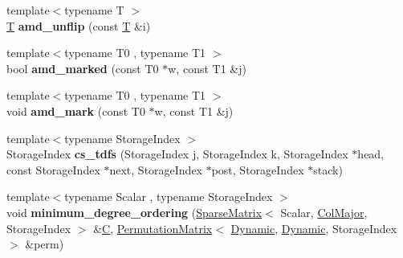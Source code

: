 \begin{DoxyCompactItemize}
\mbox{\label{namespace_eigen_1_1internal_a7f2c5d4a113f220aeb207d2e51173eb5}} 
{\footnotesize template$<$typename T $>$ }\\\hyperlink{group___sparse_core___module}{T} {\bfseries amd\+\_\+unflip} (const \hyperlink{group___sparse_core___module}{T} \&i)
\item 
\mbox{\label{namespace_eigen_1_1internal_aa833ee81053c3007dd4f7df2fd35e6cf}} 
{\footnotesize template$<$typename T0 , typename T1 $>$ }\\bool {\bfseries amd\+\_\+marked} (const T0 $\ast$w, const T1 \&j)
\item 
\mbox{\label{namespace_eigen_1_1internal_ac1ede6035fa6dd5dd1a84538be2163e9}} 
{\footnotesize template$<$typename T0 , typename T1 $>$ }\\void {\bfseries amd\+\_\+mark} (const T0 $\ast$w, const T1 \&j)
\item 
\mbox{\label{namespace_eigen_1_1internal_a10eccd9d3ce2e9cf441ae2f8db2ad569}} 
{\footnotesize template$<$typename Storage\+Index $>$ }\\Storage\+Index {\bfseries cs\+\_\+tdfs} (Storage\+Index j, Storage\+Index k, Storage\+Index $\ast$head, const Storage\+Index $\ast$next, Storage\+Index $\ast$post, Storage\+Index $\ast$stack)
\item 
\mbox{\label{namespace_eigen_1_1internal_ac4cdf88f2d52d415825bd1d185d897d6}} 
{\footnotesize template$<$typename Scalar , typename Storage\+Index $>$ }\\void {\bfseries minimum\+\_\+degree\+\_\+ordering} (\hyperlink{group___sparse_core___module_class_eigen_1_1_sparse_matrix}{Sparse\+Matrix}$<$ Scalar, \hyperlink{group__enums_ggaacded1a18ae58b0f554751f6cdf9eb13a0cbd4bdd0abcfc0224c5fcb5e4f6669a}{Col\+Major}, Storage\+Index $>$ \&\hyperlink{group___core___module}{C}, \hyperlink{group___core___module_class_eigen_1_1_permutation_matrix}{Permutation\+Matrix}$<$ \hyperlink{namespace_eigen_ad81fa7195215a0ce30017dfac309f0b2}{Dynamic}, \hyperlink{namespace_eigen_ad81fa7195215a0ce30017dfac309f0b2}{Dynamic}, Storage\+Index $>$ \&perm)
\item 
\mbox{\label{namespace_eigen_1_1internal_aba19caf9fa9d16a9eb32da224ffae2d2}} 

\end{DoxyCompactItemize}
